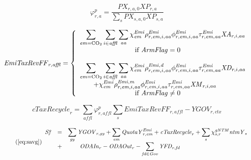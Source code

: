 \documentclass[11pt,letterpaper]{report}
\begin{document}
\begin{equation}
\label{eq:xpshr}
\varphi^p_{r,a} = \frac{\mathit{PX}_{r,a,0} \mathit{XP}_{r,a}}
{\displaystyle \sum_s{\mathit{PX}_{s,a,0} \mathit{XP}_{s,a}}}
\end{equation}

\begin{equation}
\label{eq:emitaxrefff}
\mathit{EmiTaxRevFF}_{r,\mathit{affl}} =
\left\{
   \begin{array}{*{20}{l}}
      \displaystyle \sum_{\mathit{em}=\textmd{CO}_2} { \sum_{i \in {\mathit{affl}}} {\sum_{\mathit{aa}} {
         \chi^{\mathit{Emi}}_{\mathit{em}}
         \rho^{\mathit{Emi}}_{r,\mathit{em},i,\mathit{aa}}
         \phi^{\mathit{Emi}}_{r,\mathit{em},i,\mathit{aa}}
            \tau^{\mathit{Emi}}_{r,\mathit{em},\mathit{aa}} \mathit{XA}_{r,i,aa}
      }}}
      \\ \qquad \qquad \qquad \qquad \textrm{if } \mathit{ArmFlag} = 0 \\ \\
      \displaystyle \sum_{\mathit{em}=\textmd{CO}_2} { \sum_{i \in {\mathit{affl}}} {\sum_{\mathit{aa}} {
         \chi^{\mathit{Emi}}_{\mathit{em}}
         \rho^{\mathit{Emi,d}}_{r,\mathit{em},i,\mathit{aa}}
         \phi^{\mathit{Emi}}_{r,\mathit{em},i,\mathit{aa}}
         \tau^{\mathit{Emi}}_{r,\mathit{em},\mathit{aa}}
            \mathit{XD}_{r,i,aa} }}} \\
      \qquad \displaystyle
      +  {\chi^{\mathit{Emi}}_{\mathit{em}}
            \rho^{\mathit{Emi,m}}_{r,\mathit{em},i,\mathit{aa}}
            \phi^{\mathit{Emi}}_{r,\mathit{em},i,\mathit{aa}}
            \tau^{\mathit{Emi}}_{r,\mathit{em},\mathit{aa}}\mathit{XM}_{r,i,aa}
         }
      \\ \qquad \qquad \qquad \qquad \textrm{if } \mathit{ArmFlag} \ne 0 \\
\end{array}
\right.
\end{equation}

\begin{equation}
\label{eq:ctaxRecycle}
\mathit{cTaxRecycle}_r = \sum_{\mathit{affl}} {\varphi^p_{r,\mathit{affl}}\sum_s{\mathit{EmiTaxRevFF}_{r,\mathit{affl}}}}
- \mathit{YGOV}_{r,ctx}
\end{equation}

\begin{equation}
\label{eq:savgp}
\tag{\ref{eq:savg}}
\begin{array}{l l l}
\mathit{S^g_r} & = & \displaystyle
   \sum_{\mathit{gy}} {\mathit{YGOV}_{r,\mathit{gy}}} +
   \sum_{\mathit{em}} {\mathit{QuotaY}^{\mathit{Emi}}_{r,\mathit{em}}} +
   \mathit{cTaxRecycle}_r +
   \sum_s{\chi^{\mathit{gNTM}}_{s,r} \mathit{ntmY}_s} \\
{} & + & \qquad \displaystyle \mathit{ODAIn}_r - \mathit{ODAOut}_r
   -   \sum_{\mathit{fd} \in {\mathit{Gov}}}{\mathit{YFD}_{r,\mathit{fd}}}
\end{array}
\end{equation}
\end{document}

